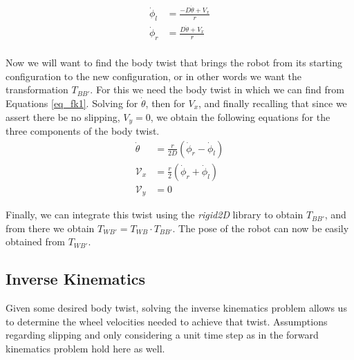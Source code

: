 \documentclass{article}
\begin{document}
\begin{equation} \label{eq_fk1}
   \begin{split}
      \dot \phi_l & = \frac{-D \dot \theta + V_x}{r} \\
      \dot \phi_r & = \frac{D \dot \theta + V_x}{r} \\
   \end{split}
\end{equation}

\noindent
Now we will want to find the body twist that brings the robot
from its starting configuration to the new configuration, or in
other words we want the transformation $T_{BB'}$. For this we need
the body twist in which we can find from Equations \ref{eq_fk1}.
Solving for $\dot \theta$, then for $V_x$, and finally recalling
that since we assert there be no slipping, $V_y = 0$, we obtain
the following equations for the three components of the body twist.
\begin{equation}
   \begin{split}
      \dot \theta & = \frac{r}{2D} \left(\dot \phi_r - \dot \phi_l\right) \\[10pt]
      \mathcal{V}_x & = \frac{r}{2} \left(\dot \phi_r + \dot \phi_l\right) \\[10pt]
      \mathcal{V}_y & = 0
   \end{split}
\end{equation}

\noindent
Finally, we can integrate this twist using the \emph{rigid2D} library
to obtain $T_{BB'}$, and from there we obtain $T_{WB'} = T_{WB} \cdot T_{BB'}$.
The pose of the robot can now be easily obtained from $T_{WB'}$.

\subsection*{Inverse Kinematics}
Given some desired body twist, solving the inverse kinematics problem
allows us to determine the wheel velocities needed to achieve that twist.
Assumptions regarding slipping and only considering a unit time step as in
the forward kinematics problem hold here as well.
\end{document}

